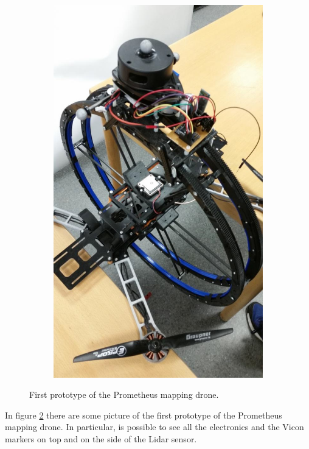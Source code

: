 \begin{figure}[h]
\begin{subfigure}[t]{0.49\textwidth}
		\includegraphics[scale = 0.25]{images/prometheus3.jpg}
		\label{subfig:prometheus4}
	\end{subfigure}
	\caption{First prototype of the Prometheus mapping drone.}
	\label{fig:prometheus}
\end{figure}

\noindent In figure \ref{fig:prometheus} there are some picture of the first prototype of the Prometheus mapping drone. In particular, is possible to see all the electronics and the Vicon markers on top and on the side of the Lidar sensor.

